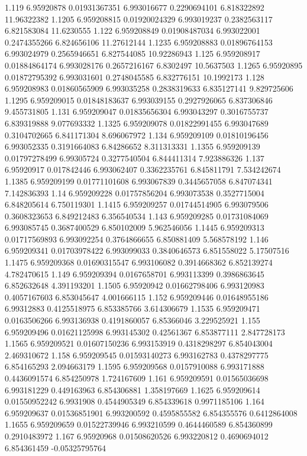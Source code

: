 {1.119 6.95920878 0.01931367351 6.993016677 0.2290694101 6.818322892 11.96322382
1.1205 6.959208815 0.01920024329 6.993019237 0.2382563117 6.821583084 11.6230555
1.122 6.959208849 0.01908487034 6.993022001 0.2474355266 6.824656106 11.27612144
1.1235 6.959208883 0.01896764153 6.993024979 0.2565946651 6.827544085 10.92286943
1.125 6.959208917 0.01884864174 6.993028176 0.2657216167 6.8302497 10.5637503
1.1265 6.95920895 0.01872795392 6.993031601 0.2748045585 6.832776151 10.1992173
1.128 6.959208983 0.01860565909 6.993035258 0.2838319633 6.835127141 9.829725606
1.1295 6.959209015 0.01848183637 6.993039155 0.2927926065 6.837306846 9.455731805
1.131 6.959209047 0.01835656304 6.993043297 0.3016755737 6.839319888 9.077693332
1.1325 6.959209078 0.01822991455 6.993047689 0.3104702665 6.841171304 8.696067972
1.134 6.959209109 0.01810196456 6.993052335 0.3191664083 6.84286652 8.311313331
1.1355 6.959209139 0.01797278499 6.99305724 0.3277540504 6.844411314 7.923886326
1.137 6.95920917 0.017842446 6.993062407 0.3362235761 6.845811791 7.534242674
1.1385 6.959209199 0.01771101608 6.993067839 0.3445657058 6.847074341 7.142836393
1.14 6.959209228 0.01757856204 6.993073538 0.3527715004 6.848205614 6.750119301
1.1415 6.959209257 0.01744514905 6.993079506 0.3608323653 6.849212483 6.356540534
1.143 6.959209285 0.01731084069 6.993085745 0.3687400529 6.850102009 5.962546056
1.1445 6.959209313 0.01717569893 6.993092254 0.3764866655 6.850881409 5.568578192
1.146 6.959209341 0.01703978422 6.993099033 0.3840646573 6.851558022 5.17507516
1.1475 6.959209368 0.01690315547 6.993106082 0.3914668362 6.852139274 4.782470615
1.149 6.959209394 0.0167658701 6.993113399 0.3986863645 6.852632648 4.391193201
1.1505 6.95920942 0.01662798406 6.993120983 0.4057167603 6.853045647 4.001666115
1.152 6.959209446 0.01648955186 6.99312883 0.4125518975 6.853385766 3.614306679
1.1535 6.959209471 0.0163506266 6.993136938 0.4191860057 6.85366046 3.229525921
1.155 6.959209496 0.01621125998 6.993145302 0.42561367 6.853877111 2.847728173
1.1565 6.959209521 0.01607150236 6.993153919 0.4318298297 6.854043004 2.469310672
1.158 6.959209545 0.01593140273 6.993162783 0.4378297775 6.854165293 2.094663179
1.1595 6.959209568 0.0157910088 6.993171888 0.4436091574 6.854250978 1.724167609
1.161 6.959209591 0.01565036698 6.993181229 0.449163963 6.854306881 1.358197669
1.1625 6.959209614 0.01550952242 6.9931908 0.4544905349 6.854339618 0.9971185106
1.164 6.959209637 0.01536851901 6.993200592 0.4595855582 6.854355576 0.6412864008
1.1655 6.959209659 0.01522739946 6.993210599 0.4644460589 6.854360899 0.2910483972
1.167 6.95920968 0.01508620526 6.993220812 0.4690694012 6.854361459 -0.05325795764
}
